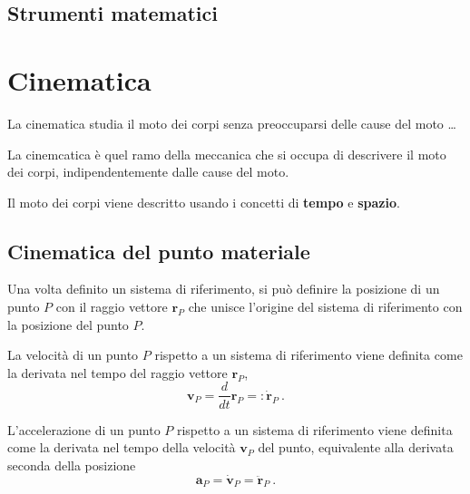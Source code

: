 \section*{Strumenti matematici}

\chapter{Cinematica}
{\color{red} La cinematica studia il moto dei corpi senza preoccuparsi delle cause del moto \dots}

\begin{definition}[Cinematica] La cinemcatica è quel ramo della meccanica che si occupa di descrivere il moto dei corpi, indipendentemente dalle cause del moto.
\end{definition}
Il moto dei corpi viene descritto usando i concetti di \textbf{tempo} e \textbf{spazio}.

\section{Cinematica del punto materiale}
\begin{definition}[Posizione]
Una volta definito un sistema di riferimento, si può definire la posizione di un punto $P$ con il raggio vettore $\mathbf{r}_P$ che unisce l'origine del sistema di riferimento con la posizione del punto $P$.
\end{definition}

\begin{definition}[Velocità]
    La velocità di un punto $P$ rispetto a un sistema di riferimento viene definita come la derivata nel tempo del raggio vettore $\mathbf{r}_P$,
    \begin{equation}
        \mathbf{v}_P = \dfrac{d}{dt}\mathbf{r}_P  =: \dot{ \mathbf{r}}_P  \ .
    \end{equation}
\end{definition}

\begin{definition}[Accelerazione]
    L'accelerazione di un punto $P$ rispetto a un sistema di riferimento viene definita come la derivata nel tempo della velocità  $\mathbf{v}_P$ del punto, equivalente alla derivata seconda della posizione
    \begin{equation}
        \mathbf{a}_P = \dot{ \mathbf{v}}_P = \ddot{ \mathbf{r}}_P \ .
    \end{equation}
\end{definition}

